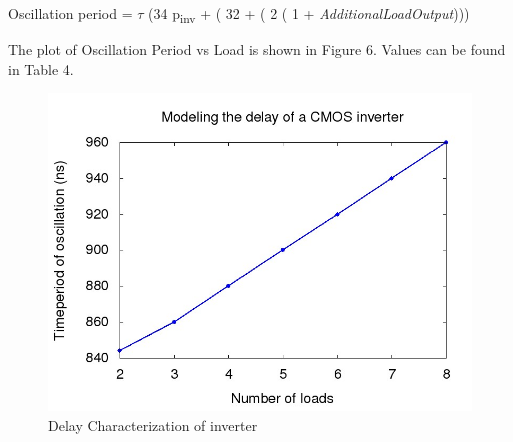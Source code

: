 \documentclass[12pt]{article}
\begin{document}
 Oscillation period =  $\tau$ \times(34 p\textsubscript{inv} + ( 32 + ( 2 \times ( 1 + \textit{AdditionalLoadOutput})))
 
 The plot of Oscillation Period vs Load is shown in Figure 6. Values can be found in Table 4.
 \begin{figure}[h]
     \centering
     \includegraphics[scale = 0.6]{figs/timeperiods.jpg}
     \caption{Delay Characterization of inverter}
     \label{fig:my_label}
 \end{figure}
  
\end{document}
